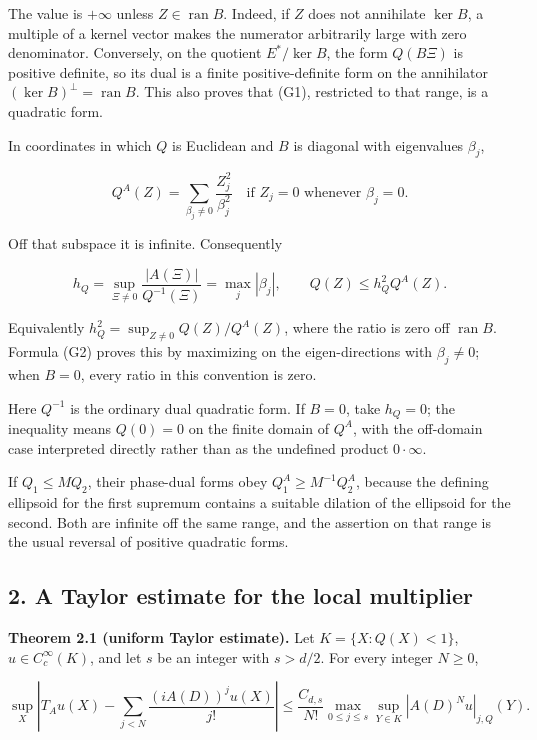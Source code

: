 \documentclass[
  11pt,
]{article}
\begin{document}
The value is \(+\infty\) unless \(Z\in\operatorname{ran}B\). Indeed, if
\(Z\) does not annihilate \(\ker B\), a multiple of a kernel vector
makes the numerator arbitrarily large with zero denominator. Conversely,
on the quotient \(E^*/\ker B\), the form \(Q(B\Xi)\) is positive
definite, so its dual is a finite positive-definite form on the
annihilator \((\ker B)^\perp=\operatorname{ran}B\). This also proves
that (G1), restricted to that range, is a quadratic form.

In coordinates in which \(Q\) is Euclidean and \(B\) is diagonal with
eigenvalues \(\beta_j\),

\[
Q^A(Z)=\sum_{\beta_j\ne0}\frac{Z_j^2}{\beta_j^2}
\quad\text{if }Z_j=0\text{ whenever }\beta_j=0.
                                                               \tag{G2}
\]

Off that subspace it is infinite. Consequently

\[
h_Q=\sup_{\Xi\ne0}\frac{|A(\Xi)|}{Q^{-1}(\Xi)}
=\max_j|\beta_j|,
\qquad
Q(Z)\leq h_Q^2Q^A(Z).                                         \tag{G3}
\]

Equivalently \(h_Q^2=\sup_{Z\ne0}Q(Z)/Q^A(Z)\), where the ratio is zero
off \(\operatorname{ran}B\). Formula (G2) proves this by maximizing on
the eigen-directions with \(\beta_j\ne0\); when \(B=0\), every ratio in
this convention is zero.

Here \(Q^{-1}\) is the ordinary dual quadratic form. If \(B=0\), take
\(h_Q=0\); the inequality means \(Q(0)=0\) on the finite domain of
\(Q^A\), with the off-domain case interpreted directly rather than as
the undefined product \(0\cdot\infty\).

If \(Q_1\leq M Q_2\), their phase-dual forms obey
\(Q_1^A\geq M^{-1}Q_2^A\), because the defining ellipsoid for the first
supremum contains a suitable dilation of the ellipsoid for the second.
Both are infinite off the same range, and the assertion on that range is
the usual reversal of positive quadratic forms.

\subsection{2. A Taylor estimate for the local
multiplier}\label{a-taylor-estimate-for-the-local-multiplier}

\textbf{Theorem 2.1 (uniform Taylor estimate).} Let \(K=\{X:Q(X)<1\}\),
\(u\in C_c^\infty(K)\), and let \(s\) be an integer with \(s>d/2\). For
every integer \(N\geq0\),

\[
\sup_X\left|T_Au(X)-\sum_{j<N}\frac{(iA(D))^ju(X)}{j!}\right|
\leq \frac{C_{d,s}}{N!}
\max_{0\leq j\leq s}\sup_{Y\in K}|A(D)^Nu|_{j,Q}(Y).          \tag{G4}
\]
\end{document}
